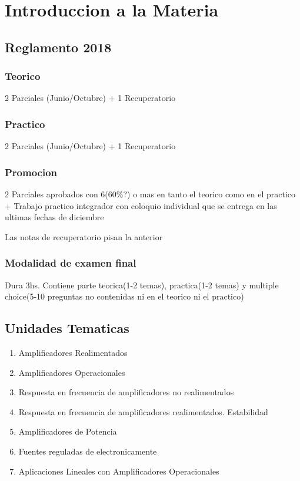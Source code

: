 \chapter*{Introduccion a la Materia}

\section*{Reglamento 2018}
\subsection*{Teorico}
2 Parciales (Junio/Octubre) + 1 Recuperatorio

\subsection*{Practico}
2 Parciales (Junio/Octubre) + 1 Recuperatorio

\subsection*{Promocion}
2 Parciales aprobados con 6(60\%?) o mas en tanto el teorico como en el 
practico + Trabajo practico integrador con coloquio individual 
que se entrega en las ultimas fechas de diciembre

Las notas de recuperatorio pisan la anterior

\subsection*{Modalidad de examen final}
Dura 3hs. Contiene parte teorica(1-2 temas), practica(1-2 temas) y multiple 
choice(5-10 preguntas no contenidas ni en el teorico ni el practico)

\section*{Unidades Tematicas}
\begin{enumerate}
	\item Amplificadores Realimentados
	\item Amplificadores Operacionales
  \item Respuesta en frecuencia de amplificadores no realimentados
  \item Respuesta en frecuencia de amplificadores realimentados. Estabilidad
  \item Amplificadores de Potencia
  \item Fuentes reguladas de electronicamente
  \item Aplicaciones Lineales con Amplificadores Operacionales
\end{enumerate}
